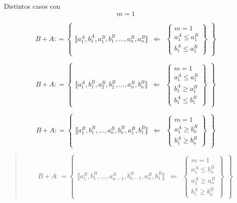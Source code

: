\begin{enumerate}
  Distintos casos con \[m = 1\]

  \[{{B + A}{: =}}\begin{Bmatrix}
  {⟦{{a_{1}^{A},b_{1}^{A}},{a_{1}^{B},b_{1}^{B}},\ldots,{a_{n}^{B},a_{n}^{B}}}⟧} & \Leftarrow & \begin{Bmatrix}
  {m = 1} \\
  {a_{1}^{A} \leq a_{1}^{B}} \\
  {b_{1}^{A} \leq a_{1}^{B}}
  \end{Bmatrix}
  \end{Bmatrix}\]

  \[{{B + A}{: =}}\begin{Bmatrix}
  {⟦{{a_{1}^{A},b_{1}^{B}},{a_{2}^{B},b_{2}^{B}},\ldots,{a_{n}^{B},b_{n}^{B}}}⟧} & \Leftarrow & \begin{Bmatrix}
  {m = 1} \\
  {a_{1}^{A} \leq a_{1}^{B}} \\
  {b_{1}^{A} \geq a_{1}^{B}} \\
  {b_{1}^{A} \leq b_{1}^{B}}
  \end{Bmatrix}
  \end{Bmatrix}\]
\end{enumerate}

\[{{B + A}{: =}}\begin{Bmatrix}
{⟦{{a_{1}^{B},b_{1}^{B}},\ldots,{a_{n}^{B},b_{n}^{B}},{a_{1}^{B},b_{1}^{B}}}⟧} & \Leftarrow & \begin{Bmatrix}
{m = 1} \\
{a_{1}^{A} \geq b_{n}^{B}} \\
{b_{1}^{A} \geq b_{n}^{B}}
\end{Bmatrix}
\end{Bmatrix}\]

\begin{quote}
\end{quote}

\begin{quote}
\[{{B + A}{: =}}\begin{Bmatrix}
{⟦{{a_{1}^{B},b_{1}^{B}},\ldots,{a_{n - 1}^{B},b_{n - 1}^{B}},{a_{n}^{B},b_{1}^{B}}}⟧} & \Leftarrow & \begin{Bmatrix}
{m = 1} \\
{a_{1}^{A} \leq b_{n}^{B}} \\
{a_{1}^{A} \geq a_{n}^{B}} \\
{b_{1}^{A} \geq b_{n}^{B}}
\end{Bmatrix}
\end{Bmatrix}\]
\end{quote}

